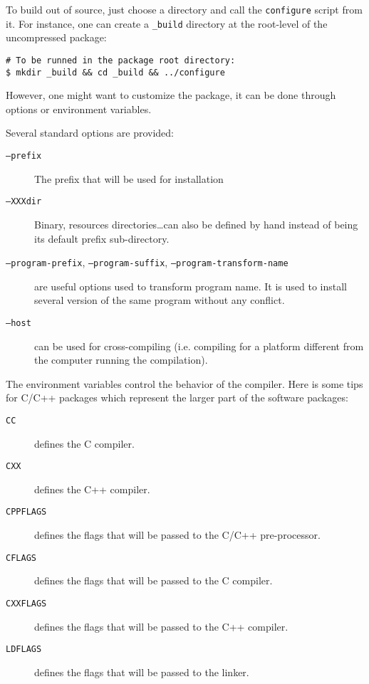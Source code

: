 To build out of source, just choose a directory and call the
\texttt{configure} script from it. For instance, one can create a
\texttt{\_build} directory at the root-level of the uncompressed
package:

\begin{verbatim}
# To be runned in the package root directory:
$ mkdir _build && cd _build && ../configure
\end{verbatim}


However, one might want to customize the package, it can be done
through options or environment variables.


Several standard options are provided:
\begin{description}
\item[\texttt{--prefix}] The prefix that will be used for installation
\item[\texttt{--XXXdir}] Binary, resources directories\ldots can also
  be defined by hand instead of being its default prefix
  sub-directory.
\item[\texttt{--program-prefix}, \texttt{--program-suffix},
  \texttt{--program-transform-name}] are useful options used to
  transform program name. It is used to install several version of the
  same program without any conflict.
\item[\texttt{--host}] can be used for cross-compiling (i.e. compiling
  for a platform different from the computer running the compilation).
\end{description}


The environment variables control the behavior of the compiler. Here
is some tips for C/C++ packages which represent the larger part of the
software packages:

\begin{description}
\item[\texttt{CC}] defines the C compiler.
\item[\texttt{CXX}] defines the C++ compiler.
\item[\texttt{CPPFLAGS}] defines the flags that will be passed to the
  C/C++ pre-processor.
\item[\texttt{CFLAGS}] defines the flags that will be passed to the C
  compiler.
\item[\texttt{CXXFLAGS}] defines the flags that will be passed to the
  C++ compiler.
\item[\texttt{LDFLAGS}] defines the flags that will be passed to the
  linker.
\end{description}

